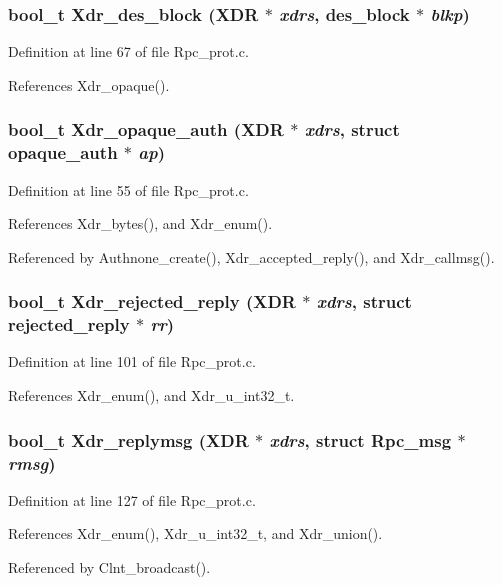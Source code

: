 \subsubsection{\setlength{\rightskip}{0pt plus 5cm}bool\_\-t Xdr\_\-des\_\-block (XDR $\ast$ {\em xdrs}, des\_\-block $\ast$ {\em blkp})}\label{Rpc__prot_8c_a3}




Definition at line 67 of file Rpc\_\-prot.c.

References Xdr\_\-opaque().
\subsubsection{\setlength{\rightskip}{0pt plus 5cm}bool\_\-t Xdr\_\-opaque\_\-auth (XDR $\ast$ {\em xdrs}, struct opaque\_\-auth $\ast$ {\em ap})}\label{Rpc__prot_8c_a2}




Definition at line 55 of file Rpc\_\-prot.c.

References Xdr\_\-bytes(), and Xdr\_\-enum().

Referenced by Authnone\_\-create(), Xdr\_\-accepted\_\-reply(), and Xdr\_\-callmsg().
\subsubsection{\setlength{\rightskip}{0pt plus 5cm}bool\_\-t Xdr\_\-rejected\_\-reply (XDR $\ast$ {\em xdrs}, struct rejected\_\-reply $\ast$ {\em rr})}\label{Rpc__prot_8c_a5}




Definition at line 101 of file Rpc\_\-prot.c.

References Xdr\_\-enum(), and Xdr\_\-u\_\-int32\_\-t.
\subsubsection{\setlength{\rightskip}{0pt plus 5cm}bool\_\-t Xdr\_\-replymsg (XDR $\ast$ {\em xdrs}, struct Rpc\_\-msg $\ast$ {\em rmsg})}\label{Rpc__prot_8c_a6}




Definition at line 127 of file Rpc\_\-prot.c.

References Xdr\_\-enum(), Xdr\_\-u\_\-int32\_\-t, and Xdr\_\-union().

Referenced by Clnt\_\-broadcast().
